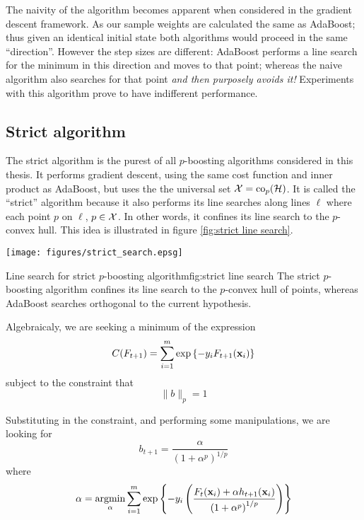 The naivity of the algorithm becomes apparent when considered in
the gradient descent framework.  As our sample weights are calculated
the same as AdaBoost; thus given an identical initial state both
algorithms would proceed in the same ``direction''.  However the step
sizes are different: AdaBoost performs a line search for the minimum
in this direction and moves to that point; whereas the naive algorithm
also searches for that point \emph{and then purposely avoids it!}
Experiments with this algorithm prove to have indifferent performance.

\subsection{Strict algorithm}

The strict algorithm is the purest of all $p$-boosting algorithms
considered in this thesis.  It performs gradient descent, using the
same cost function and inner product as AdaBoost, but uses the the
universal set $\mathcal{X} = \mathrm{co}_p(\mathcal{H})$.  It is called the ``strict''
algorithm because it also performs its line searches along lines
$\ell$ where each point $p$ on $\ell$, $p \in \mathcal{X}$.  In other words,
it confines its line search to the $p$-convex hull.  This idea is
illustrated in figure \ref{fig:strict line search}.

\begin{linefigure}
\begin{center}
\texttt{[image: figures/strict\_search.epsg]}
\end{center}
\begin{capt}{Line search for strict $p$-boosting algorithm}{fig:strict line search}
The strict $p$-boosting algorithm confines its line search to the
$p$-convex hull of points, whereas AdaBoost searches orthogonal to the
current hypothesis.
\end{capt}
\end{linefigure}

Algebraicaly, we are seeking a minimum of the expression
%
\begin{equation}
C(F_{t+1}) = \sum_{i=1}^{m} \exp \left\{ -y_i F_{t+1}(\mathbf{x}_i) \right\}
\end{equation}
%
subject to the constraint that
%
\begin{equation}
\| b \|_{p} = 1
\end{equation}

Substituting in the constraint, and performing some manipulations, we
are looking for
%
\begin{equation}
b_{t+1} = \frac{\alpha}{\left( 1 + \alpha^p \right) ^ {1/p}}
\end{equation}
%
where
%
\begin{equation}
\alpha = \argmin_{\alpha} \sum_{i=1}^{m} \exp \left\{ -y_i \left(
\frac{F_{t}(\bfx_i) + \alpha h_{t+1}(\bfx_i)}{\left( 1 + \alpha ^p
\right) ^{1/p}} \right) \right\}
\label{eqn:strict minimise function}
\end{equation}

